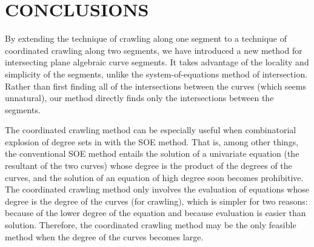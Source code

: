 %
%
%
%


\section{CONCLUSIONS}

By extending the technique of crawling along one segment to a technique of 
coordinated crawling along two segments,
we have introduced a new method for intersecting plane algebraic curve segments.
It takes advantage of the locality and simplicity of the segments, unlike the
system-of-equations method of intersection.
Rather than first finding all of the intersections between the curves (which 
seems unnatural), our method directly finds only the intersections between the segments.

The coordinated crawling method can be especially useful when combinatorial explosion
of degree sets in with the SOE method.
That is, among other things, the conventional SOE method entails the solution of a 
univariate equation (the resultant of the two curves) whose degree is the product 
of the degrees of the curves, and the solution of an equation of high degree  
soon becomes prohibitive.
The coordinated crawling method only involves the evaluation of equations whose
degree is the degree of the curves (for crawling), which is simpler for two reasons:
because of the lower degree of the equation and because evaluation
is easier than solution.
Therefore, the coordinated crawling method may be the only feasible method when the
degree of the curves becomes large.

